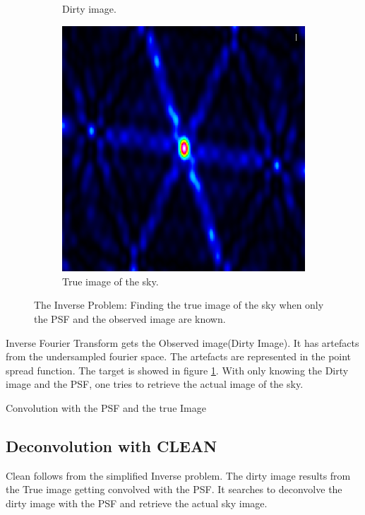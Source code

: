 \begin{figure}[h!]
\begin{subfigure}[b]{0.3\linewidth}
		\caption{Dirty image.}
	\end{subfigure}
	\begin{subfigure}[b]{0.3\linewidth}
		\includegraphics[width=\linewidth]{./chapters/01.intro/img/PSF.png}
		\caption{True image of the sky.}
	\end{subfigure}
	\caption{The Inverse Problem: Finding the true image of the sky when only the PSF and the observed image are known.}
	\label{intro:inverse_problem}
\end{figure}

Inverse Fourier Transform gets the Observed image(Dirty Image). It has artefacts from the undersampled fourier space. The artefacts are represented in the point spread function. The target is showed in figure \ref{intro:inverse_problem}. With only knowing the Dirty image and the PSF, one tries to retrieve the actual image of the sky.

Convolution with the PSF and the true Image


\subsection{Deconvolution with CLEAN}
Clean follows from the simplified Inverse problem. The dirty image results from the True image getting convolved with the PSF. It searches to deconvolve the dirty image with the PSF and retrieve the actual sky image.

